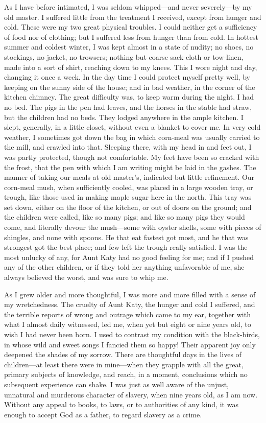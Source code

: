 As I have before intimated, I was seldom whipped---and never
severely---by my old master. I suffered little from the treatment I
received, except from hunger and cold. These were my two great physical
troubles. I could neither get a sufficiency of food nor of clothing; but
I suffered less from hunger than from cold. In hottest summer and
coldest winter, I was kept almost in a state of nudity; no shoes, no
stockings, no jacket, no trowsers; nothing but coarse sack-cloth or
tow-linen, made into a sort of shirt, reaching down to my knees. This I
wore night and day, changing it once a week. In the day time I could
protect myself pretty well, by keeping on the sunny side of the house;
and in bad weather, in the corner of the kitchen chimney. The great
difficulty was, to keep warm during the night. I had no bed. The pigs in
the pen had leaves, and the horses in the stable had straw, but the
children had no beds. They lodged anywhere in the ample kitchen. I
slept, generally, in a little closet, without even a blanket to cover
me. In very cold weather, I sometimes got down the bag in which
corn-meal was usually carried to the mill, and crawled into that.
Sleeping there, with my head in and feet out, I was partly protected,
though not comfortable. My feet have been so cracked with the frost,
that the pen with which I am writing might be laid in the gashes. The
manner of taking our meals at old master's, indicated but little
refinement. Our corn-meal mush, when sufficiently {}cooled, was placed
in a large wooden tray, or trough, like those used in making maple sugar
here in the north. This tray was set down, either on the floor of the
kitchen, or out of doors on the ground; and the children were called,
like so many pigs; and like so many pigs they would come, and literally
devour the mush---some with oyster shells, some with pieces of shingles,
and none with spoons. He that eat fastest got most, and he that was
strongest got the best place; and few left the trough really satisfied.
I was the most unlucky of any, for Aunt Katy had no good feeling for me;
and if I pushed any of the other children, or if they told her anything
unfavorable of me, she always believed the worst, and was sure to whip
me.

As I grew older and more thoughtful, I was more and more filled with a
sense of my wretchedness. The cruelty of Aunt Katy, the hunger and cold
I suffered, and the terrible reports of wrong and outrage which came to
my ear, together with what I almost daily witnessed, led me, when yet
but eight or nine years old, to wish I had never been born. I used to
contrast my condition with the black-birds, in whose wild and sweet
songs I fancied them so happy! Their apparent joy only deepened the
shades of my sorrow. There are thoughtful days in the lives of
children---at least there were in mine---when they grapple with all the
great, primary subjects of knowledge, and reach, in a moment,
conclusions which no subsequent experience can shake. I was just as well
aware of the unjust, unnatural and murderous character of slavery, when
nine years old, as I am now. Without {}any appeal to books, to laws, or
to authorities of any kind, it was enough to accept God as a father, to
regard slavery as a crime.

